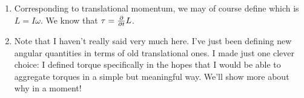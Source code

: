 \begin{enumerate}
  \item Corresponding to translational momentum, we may of course define
   which is $L = I \omega$. We know that $\tau
  = \frac{\partial }{\partial t} L$.

  \item Note that I haven't really said very much here. I've just been
  defining new angular quantities in terms of old translational ones. I
  made just one clever choice: I defined torque specifically in the
  hopes that I would be able to aggregate torques in a simple but
  meaningful way. We'll show more about why in a moment!
\end{enumerate}
